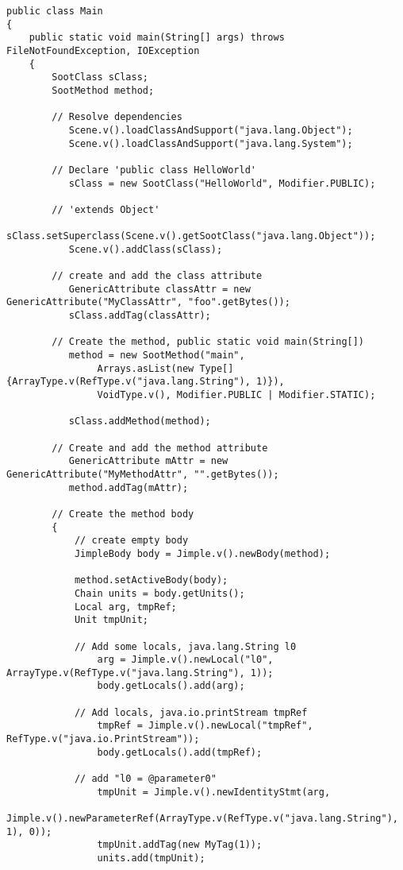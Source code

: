 \documentclass{article}
\begin{document}
\begin{verbatim}
public class Main
{
    public static void main(String[] args) throws FileNotFoundException, IOException
    {
        SootClass sClass;
        SootMethod method;
        
        // Resolve dependencies
           Scene.v().loadClassAndSupport("java.lang.Object");
           Scene.v().loadClassAndSupport("java.lang.System");
           
        // Declare 'public class HelloWorld'   
           sClass = new SootClass("HelloWorld", Modifier.PUBLIC);

        // 'extends Object'
           sClass.setSuperclass(Scene.v().getSootClass("java.lang.Object"));
           Scene.v().addClass(sClass);
           
        // create and add the class attribute
           GenericAttribute classAttr = new GenericAttribute("MyClassAttr", "foo".getBytes());
           sClass.addTag(classAttr);
           
        // Create the method, public static void main(String[])
           method = new SootMethod("main",
                Arrays.asList(new Type[] {ArrayType.v(RefType.v("java.lang.String"), 1)}),
                VoidType.v(), Modifier.PUBLIC | Modifier.STATIC);
        
           sClass.addMethod(method);

        // Create and add the method attribute
           GenericAttribute mAttr = new GenericAttribute("MyMethodAttr", "".getBytes());
           method.addTag(mAttr);
           
        // Create the method body
        {
            // create empty body
            JimpleBody body = Jimple.v().newBody(method);
            
            method.setActiveBody(body);
            Chain units = body.getUnits();
            Local arg, tmpRef;
            Unit tmpUnit;
            
            // Add some locals, java.lang.String l0
                arg = Jimple.v().newLocal("l0", ArrayType.v(RefType.v("java.lang.String"), 1));
                body.getLocals().add(arg);
            
            // Add locals, java.io.printStream tmpRef
                tmpRef = Jimple.v().newLocal("tmpRef", RefType.v("java.io.PrintStream"));
                body.getLocals().add(tmpRef);
                
            // add "l0 = @parameter0"
                tmpUnit = Jimple.v().newIdentityStmt(arg, 
                     Jimple.v().newParameterRef(ArrayType.v(RefType.v("java.lang.String"), 1), 0));
                tmpUnit.addTag(new MyTag(1));
                units.add(tmpUnit);
            

\end{verbatim}
\end{document}
